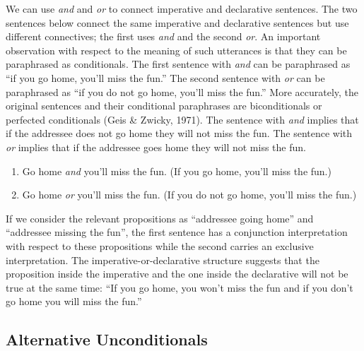 \documentclass[oneside]{report}
\theoremstyle{definition}
\theoremstyle{definition}
\theoremstyle{definition}
\theoremstyle{remark}
\begin{document}
We can use \emph{and} and \emph{or} to connect imperative and
declarative sentences. The two sentences below connect the same
imperative and declarative sentences but use different connectives; the
first uses \emph{and} and the second \emph{or}. An important observation
with respect to the meaning of such utterances is that they can be
paraphrased as conditionals. The first sentence with \emph{and} can be
paraphrased as ``if you go home, you'll miss the fun.'' The second
sentence with \emph{or} can be paraphrased as ``if you do not go home,
you'll miss the fun.'' More accurately, the original sentences and their
conditional paraphrases are biconditionals or perfected conditionals
(Geis \& Zwicky, 1971). The sentence with \emph{and} implies that if the
addressee does not go home they will not miss the fun. The sentence with
\emph{or} implies that if the addressee goes home they will not miss the
fun.
\begin{enumerate}
\def\labelenumi{(\arabic{enumi})}
\setcounter{enumi}{17}
\tightlist
\item
  Go home \emph{and} you'll miss the fun. (If you go home, you'll miss
  the fun.)
\item
  Go home \emph{or} you'll miss the fun. (If you do not go home, you'll
  miss the fun.)
\end{enumerate}
If we consider the relevant propositions as ``addressee going home'' and
``addressee missing the fun'', the first sentence has a conjunction
interpretation with respect to these propositions while the second
carries an exclusive interpretation. The imperative-or-declarative
structure suggests that the proposition inside the imperative and the
one inside the declarative will not be true at the same time: ``If you
go home, you won't miss the fun and if you don't go home you will miss
the fun.''

\subsection{Alternative
Unconditionals}\label{alternative-unconditionals}
\end{document}
